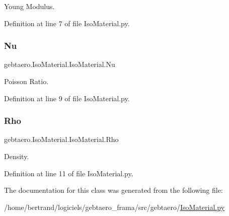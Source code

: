 Young Modulus. 



Definition at line 7 of file Iso\+Material.\+py.

\mbox{\label{classgebtaero_1_1_iso_material_1_1_iso_material_a1a590e5600152a083c4ee3d0fb12451a}} 
\subsubsection{\texorpdfstring{Nu}{Nu}}
{\footnotesize\ttfamily gebtaero.\+Iso\+Material.\+Iso\+Material.\+Nu}



Poisson Ratio. 



Definition at line 9 of file Iso\+Material.\+py.

\mbox{\label{classgebtaero_1_1_iso_material_1_1_iso_material_ace8e4cdd649efe5f36fd0093afa6b93a}} 
\subsubsection{\texorpdfstring{Rho}{Rho}}
{\footnotesize\ttfamily gebtaero.\+Iso\+Material.\+Iso\+Material.\+Rho}



Density. 



Definition at line 11 of file Iso\+Material.\+py.



The documentation for this class was generated from the following file\+:\begin{DoxyCompactItemize}
\item 
/home/bertrand/logiciels/gebtaero\+\_\+frama/src/gebtaero/\hyperlink{_iso_material_8py}{Iso\+Material.\+py}\end{DoxyCompactItemize}
